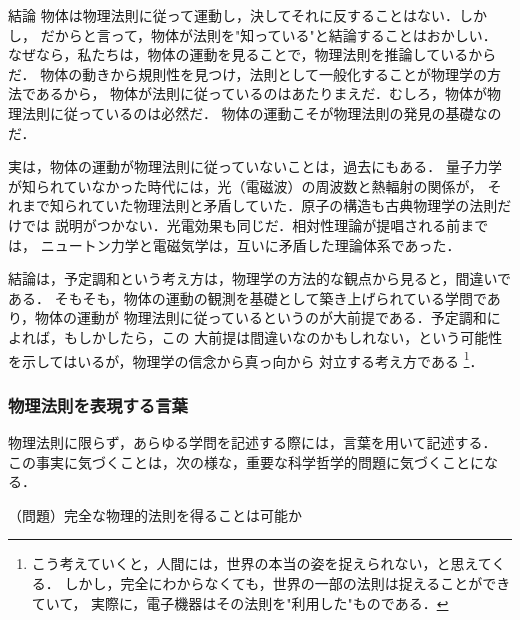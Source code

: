             \begin{mysmallsec}{結論}
            物体は物理法則に従って運動し，決してそれに反することはない．しかし，
            だからと言って，物体が法則を"知っている"と結論することはおかしい．
            なぜなら，私たちは，物体の運動を見ることで，物理法則を推論しているからだ．
            物体の動きから規則性を見つけ，法則として一般化することが物理学の方法であるから，
            物体が法則に従っているのはあたりまえだ．むしろ，物体が物理法則に従っているのは必然だ．
            物体の運動こそが物理法則の発見の基礎なのだ．

            実は，物体の運動が物理法則に従っていないことは，過去にもある．
            量子力学が知られていなかった時代には，光（電磁波）の周波数と熱輻射の関係が，
            それまで知られていた物理法則と矛盾していた．原子の構造も古典物理学の法則だけでは
            説明がつかない．光電効果も同じだ．相対性理論が提唱される前までは，
            ニュートン力学と電磁気学は，互いに矛盾した理論体系であった．

            結論は，予定調和という考え方は，物理学の方法的な観点から見ると，間違いである．
            そもそも，物体の運動の観測を基礎として築き上げられている学問であり，物体の運動が
            物理法則に従っているというのが大前提である．予定調和によれば，もしかしたら，この
            大前提は間違いなのかもしれない，という可能性を示してはいるが，物理学の信念から真っ向から
            対立する考え方である
                \footnote{
                    こう考えていくと，人間には，世界の本当の姿を捉えられない，と思えてくる．
                    しかし，完全にわからなくても，世界の一部の法則は捉えることができていて，
                    実際に，電子機器はその法則を"利用した"ものである．
                }．
            \end{mysmallsec}

            \subsubsection{物理法則を表現する言葉}
                物理法則に限らず，あらゆる学問を記述する際には，言葉を用いて記述する．
                この事実に気づくことは，次の様な，重要な科学哲学的問題に気づくことになる．
                    \begin{center}
                    （問題）完全な物理的法則を得ることは可能か
                    \end{center}

